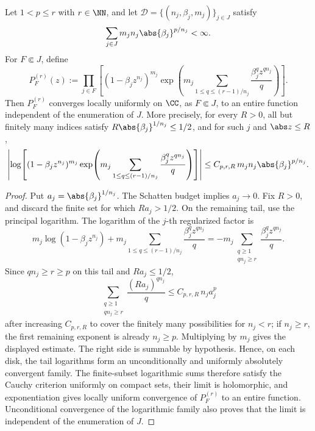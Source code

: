 \begin{lemma}
  \label{lem:regularized-cyclic-finite-subset-products}
  Let \(1<p\le r\) with \(r\in\NN\), and let
  \(\mathcal D=\{(n_j,\beta_j,m_j)\}_{j\in J}\) satisfy
  \[
    \sum_{j\in J}m_jn_j\abs{\beta_j}^{p/n_j}<\infty.
  \]
  For \(F\Subset J\), define
  \[
    P_F^{(r)}(z):=
    \prod_{j\in F}
    \left[(1-\beta_jz^{n_j})^{m_j}
      \exp\!\left(
        m_j\sum_{1\le q\le (r-1)/n_j}
          \frac{\beta_j^qz^{qn_j}}{q}
      \right)\right].
  \]
  Then \(P_F^{(r)}\) converges locally uniformly on \(\CC\), as
  \(F\Subset J\), to an entire function independent of the enumeration of
  \(J\). More precisely, for every \(R>0\), all but finitely many
  indices satisfy \(R\abs{\beta_j}^{1/n_j}\le1/2\), and for such \(j\)
  and \(\abs z\le R\),
  \[
    \left|
      \log\!\left[
        (1-\beta_jz^{n_j})^{m_j}
        \exp\!\left(
          m_j\sum_{1\le q\le (r-1)/n_j}
            \frac{\beta_j^qz^{qn_j}}{q}
        \right)
      \right]
    \right|
    \le C_{p,r,R}\,m_jn_j\abs{\beta_j}^{p/n_j}.
  \]
\end{lemma}

\begin{proof}
  Put \(a_j=\abs{\beta_j}^{1/n_j}\). The Schatten budget implies
  \(a_j\to0\). Fix \(R>0\), and discard the finite set for which
  \(Ra_j>1/2\). On the remaining tail, use the principal logarithm. The
  logarithm of the \(j\)-th regularized factor is
  \[
    m_j\log(1-\beta_jz^{n_j})
    +m_j\sum_{1\le q\le(r-1)/n_j}
      \frac{\beta_j^qz^{qn_j}}{q}
    =
    -m_j\sum_{\substack{q\ge1\\ qn_j\ge r}}
      \frac{\beta_j^qz^{qn_j}}{q}.
  \]
  Since \(qn_j\ge r\ge p\) on this tail and \(Ra_j\le1/2\),
  \[
    \sum_{\substack{q\ge1\\ qn_j\ge r}}
      \frac{(Ra_j)^{qn_j}}{q}
    \le
    C_{p,r,R}\,n_j a_j^p
  \]
  after increasing \(C_{p,r,R}\) to cover the finitely many possibilities
  for \(n_j<r\); if \(n_j\ge r\), the first remaining exponent is already
  \(n_j\ge p\). Multiplying by \(m_j\) gives the displayed estimate. The
  right side is summable by hypothesis. Hence, on each disk, the tail
  logarithms form an unconditionally and uniformly absolutely convergent
  family. The finite-subset logarithmic sums therefore satisfy the Cauchy
  criterion uniformly on compact sets, their limit is holomorphic, and
  exponentiation gives locally uniform convergence of \(P_F^{(r)}\) to an
  entire function. Unconditional convergence of the logarithmic family
  also proves that the limit is independent of the enumeration of \(J\).
\end{proof}


